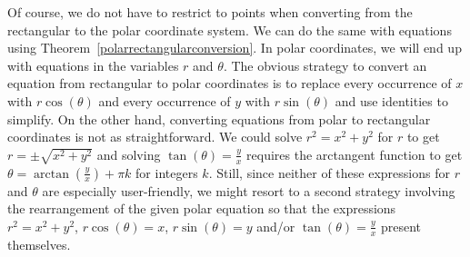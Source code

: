 Of course, we do not have to restrict to points when converting from the rectangular to the polar coordinate system. We can do the same with equations  using Theorem~\ref{polarrectangularconversion}.  In polar coordinates, we will end up with equations in the variables $r$ and $\theta$. The obvious strategy to convert an equation from rectangular to polar coordinates is to replace every occurrence of $x$ with $r\cos(\theta)$ and every occurrence of $y$ with $r\sin(\theta)$ and use identities to simplify. On the other hand,  converting equations from polar to rectangular coordinates is not as straightforward.  We could solve $r^2 = x^2 + y^2$ for $r$ to get $r = \pm \sqrt{x^2+y^2}$ and solving $\tan(\theta) = \frac{y}{x}$ requires the arctangent function to get  $\theta = \arctan\left(\frac{y}{x}\right) + \pi k$ for integers $k$.  Still, since neither of these expressions for $r$ and $\theta$ are especially user-friendly, we might resort to a second strategy involving the rearrangement of the given polar equation so that the expressions $r^2 = x^2+y^2$, $r\cos(\theta)=x$,  $r\sin(\theta)=y$ and/or $\tan(\theta) = \frac{y}{x}$ present themselves.


